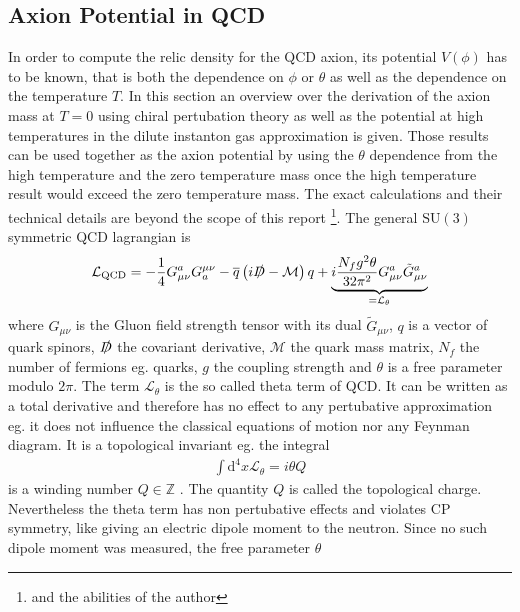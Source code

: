 \documentclass[a4paper, 12pt]{article}
\newcommand{\diff}{\mathrm{d}}
\begin{document}
\subsection{Axion Potential in QCD}
In order to compute the relic density for the QCD axion, its potential $V(\phi)$ has to be known, that is
both the dependence on $\phi$ or $\theta$ as well as the dependence on the temperature $T$.
In this section an overview over the derivation of the axion mass at $T = 0$ using chiral pertubation theory as well as the potential at
high temperatures in the dilute instanton gas approximation is given.
Those results can be used together as the axion potential by using the
$\theta$ dependence from the high temperature and the zero temperature
mass once the high temperature result would exceed the zero temperature mass.
The exact calculations and their technical details are beyond
the scope of this report \footnote{and the abilities of the author}.
The general $\mathrm{SU}(3)$ symmetric QCD lagrangian is \cite[Chap. VII.3, Page 369]{Nutshell}
\begin{align*}
    \mathcal{L}_\mathrm{QCD} = - \frac{1}{4} G^a_{\mu \nu} G^{\mu \nu}_a - \overline{q} \left( i \slashed{D} - \mathcal{M} \right) q + \underbrace{i \frac{N_f g^2 \theta}{32 \pi^2} G_{\mu \nu}^a \tilde{G}_{\mu \nu}^a}_{= \mathcal{L}_\theta}
\end{align*}
where $G_{\mu \nu}$ is the Gluon field strength tensor with its dual $\tilde{G}_{\mu \nu}$, $q$ is a vector of quark spinors,
$\slashed{D}$ the covariant derivative, $\mathcal{M}$ the quark mass matrix,
$N_f$ the number of fermions eg. quarks, $g$ the coupling strength and $\theta$ is a free parameter modulo $2\pi$.
The term $\mathcal{L}_\theta$ is the so called theta term of QCD. It can be written as a total derivative and therefore has no effect to
any pertubative approximation eg. it does not influence the classical equations of motion nor any Feynman diagram.
It is a topological invariant eg. the integral
\begin{align*}
    \int \diff^4 x \mathcal{L}_\theta = i \theta Q
\end{align*}
is a winding number $Q \in \mathbb{Z}$ \cite[Sec. II, Eq. 2.6]{Leutwyler:1992yt}. The quantity $Q$ is called the topological charge.
Nevertheless the theta term has non pertubative effects and violates CP symmetry, like giving an electric dipole moment to the neutron. Since no such dipole moment was measured, the free parameter $\theta$
\end{document}
